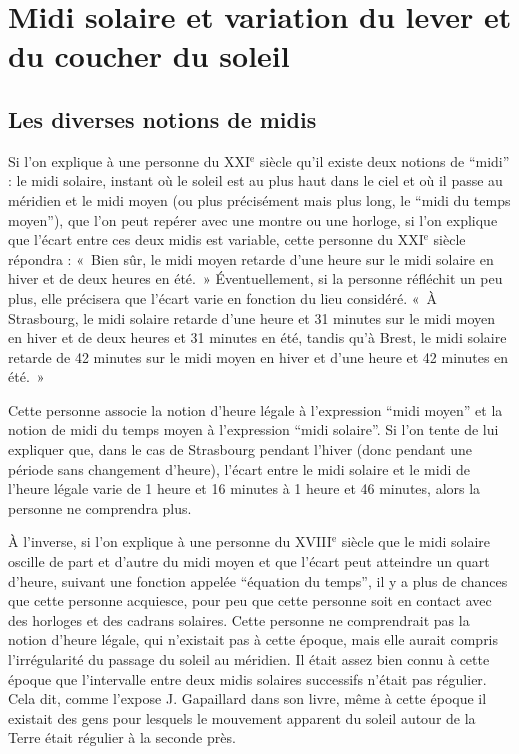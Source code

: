 \documentclass[a4paper]{article}
\newenvironment{texte}{\rmfamily}{}
\newcommand{\ee}[0]{$^\mathrm{e}$}
\begin{document}
\begin{texte}
\section{Midi solaire et variation du lever et du coucher du soleil}

\subsection{Les diverses notions de midis}

Si l'on explique à une personne du XXI\ee{} siècle qu'il existe
deux notions de ``midi'' : le midi solaire, instant où le soleil
est au plus haut dans le ciel et où il passe au méridien et 
le midi moyen (ou plus précisément mais plus long, le
``midi du temps moyen''), que l'on peut repérer avec une montre ou une horloge,
si l'on explique que l'écart entre ces deux midis est variable,
cette personne du XXI\ee{} siècle répondra : «~Bien sûr, 
le midi moyen retarde d'une heure sur le midi solaire en hiver
et de deux heures en été.~» Éventuellement, si la personne réfléchit
un peu plus, elle précisera que l'écart varie en fonction du lieu
considéré. «~À Strasbourg, le midi solaire retarde d'une heure
et 31 minutes sur le midi moyen en hiver et de deux heures et
31 minutes en été, tandis qu'à Brest, le midi solaire retarde
de 42 minutes sur le midi moyen en hiver et d'une heure et 42 minutes
en été.~»

Cette personne associe la notion d'heure légale à l'expression ``midi moyen''
et la notion de midi du temps moyen à l'expression ``midi solaire''.
Si l'on tente de lui expliquer que, dans le cas de Strasbourg pendant l'hiver
(donc pendant une période sans changement d'heure), l'écart
entre le midi solaire et le midi de l'heure légale varie
de 1 heure et 16 minutes à 1 heure et 46 minutes, alors la personne
ne comprendra plus.

À l'inverse, si l'on explique à une personne du XVIII\ee{} siècle que
le midi solaire oscille de part et d'autre du midi moyen et que
l'écart peut atteindre un quart d'heure, suivant une fonction appelée
``équation du temps'', il y a plus de chances que cette personne
acquiesce, pour peu que cette personne soit en contact avec des
horloges et des cadrans solaires. Cette personne ne comprendrait pas
la notion d'heure légale, qui n'existait pas à cette époque, mais elle
aurait compris l'irrégularité du passage du soleil au méridien. Il
était assez bien connu à cette époque que l'intervalle entre deux
midis solaires successifs n'était pas régulier. Cela dit, comme
l'expose J. Gapaillard dans son livre, même à cette époque il existait
des gens pour lesquels le mouvement apparent du soleil autour de la
Terre était régulier à la seconde près.


\end{texte}
\end{document}
